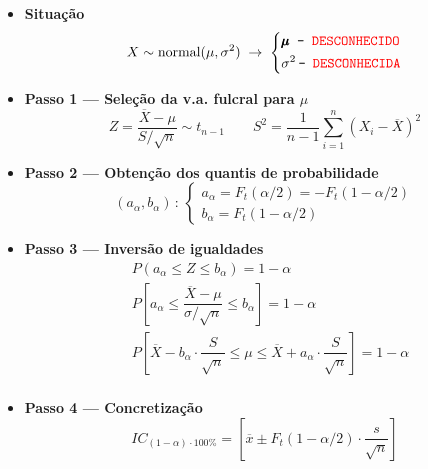 \begin{mdframed}
    \begin{itemize}[leftmargin=*,noitemsep]
        \item \textbf{Situação}
        $$
            X \sim \text{normal}(\mu, \sigma^2) \;\rightarrow\; \left\{
            \begin{aligned}
                &\pmb{\mu} \mkern9.5mu\texttt{-}\mkern9.5mu \texttt{\color{red} DESCONHECIDO} \\
                &\sigma^2 \mkern3mu\texttt{-}\mkern9mu \texttt{\color{red} DESCONHECIDA}
            \end{aligned}\right.
        $$
        
        \item \textbf{Passo 1 --- Seleção da v.a. fulcral para $\mu$}
        $$
            Z = \dfrac{\overline{X} - \mu}{S/\sqrt{n}} \sim t_{n - 1}\qquad
            S^2 = \dfrac{1}{n - 1} \sum_{i = 1}^{n}(X_i - \overline{X})^2
        $$
    
        \item \textbf{Passo 2 --- Obtenção dos quantis de probabilidade}
         $$
            (a_\alpha, b_\alpha)\, :\, \left\{\begin{array}{ll}
                 a_\alpha = F_t(\alpha/2) = -F_t(1 - \alpha/2)\\
                 b_\alpha = F_t(1 - \alpha/2)
            \end{array}\right.
        $$
    
        \item \textbf{Passo 3 --- Inversão de igualdades}
        $$
            \begin{aligned}
                &P(a_\alpha \leq Z \leq b_\alpha) = 1 - \alpha\\
                &P\left[a_\alpha \leq \dfrac{\overline{X} - \mu}{\sigma/\sqrt{n}} \leq b_\alpha\right] = 1 - \alpha\\
                &P\left[\overline{X} - b_\alpha\cdot \dfrac{S}{\sqrt{n}} \leq \mu \leq \overline{X} + a_\alpha\cdot \dfrac{S}{\sqrt{n}}\right] = 1 - \alpha\\
            \end{aligned}
        $$
    
        \item\textbf{Passo 4 --- Concretização}
        $$
            IC_{(1 - \alpha)\cdot 100\%} = \left[\overline{x} \pm F_t(1 - \alpha/2) \cdot \dfrac{s}{\sqrt{n}}\right]
        $$
    \end{itemize}
\end{mdframed}

